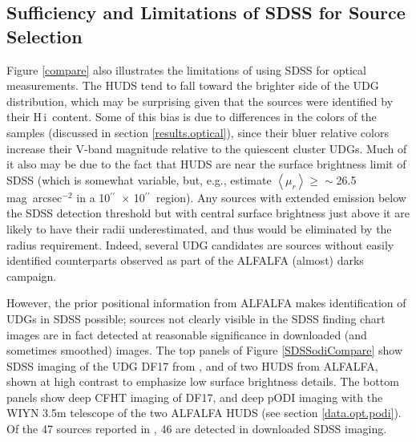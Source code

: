 \documentclass[twocolumn]{aastex6}
\def\arcsec{$^{\prime\prime}$}
\newcommand{\hi}{H{\sc\,i}}
\begin{document}
\subsection{Sufficiency and Limitations of SDSS for Source Selection}
\label{sample.limits}
Figure \ref{compare} also illustrates the limitations of using SDSS for optical measurements. The HUDS tend to fall toward the 
brighter side of the UDG distribution, which may be surprising given that the sources were identified by their \hi\ content. Some of this bias is due to differences in the colors of the samples (discussed in section \ref{results.optical}), since their bluer relative colors increase their V-band magnitude relative to the quiescent cluster UDGs. Much of it also may be
due to the fact that HUDS are near the surface brightness limit of SDSS (which is somewhat variable, but, e.g., \cite{trujillo16a} estimate $\left< \mu_{r} \right> \ge \sim$26.5 mag~arcsec$^{-2}$ in a 10\arcsec\ $\times$ 10\arcsec\ region). Any sources with extended emission below the SDSS detection threshold but with central surface brightness just above it are likely to have their radii underestimated, and thus would be eliminated by the radius requirement. 
 Indeed, several UDG candidates are sources without easily identified counterparts observed as part of the ALFALFA (almost) darks campaign. 

However, the prior positional information from ALFALFA makes identification of UDGs in SDSS possible; sources not clearly visible in the SDSS finding chart images are in fact detected at reasonable significance in downloaded (and sometimes smoothed) images. 
The top panels of Figure \ref{SDSSodiCompare} show SDSS imaging of the UDG DF17 from \cite{vandokkum15a}, and of two HUDS from ALFALFA, shown at high contrast to emphasize low surface brightness details. The bottom panels show deep CFHT imaging of DF17, and deep pODI imaging with the WIYN 3.5m telescope of the two ALFALFA HUDS (see section \ref{data.opt.podi}). %
Of the 47 sources reported in \cite{vandokkum15a}, 46 are detected in downloaded SDSS imaging. 
\end{document}
